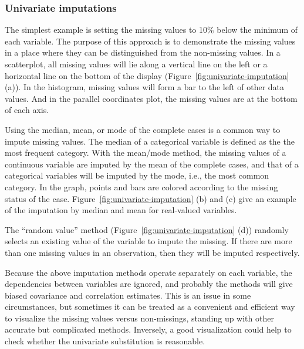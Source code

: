\documentclass[article]{jss}
\begin{document}
\subsubsection{Univariate imputations}

The simplest example is setting the missing values to 10\% below the minimum of each variable. The purpose of this approach is to demonstrate the missing values in a place where they can be distinguished from the non-missing values. In a scatterplot, all missing values will lie along a vertical line on the left or a horizontal line on the bottom of the display (Figure~\ref{fig:univariate-imputation} (a)). In the histogram, missing values will form a bar to the left of other data values. And in the parallel coordinates plot, the missing values are at the bottom of each axis.

Using the median, mean, or mode of the complete cases is a common way to impute missing values. The median of a categorical variable is defined as the the most frequent category. With the mean/mode method, the missing values of a continuous variable are imputed by the mean of the complete cases, and that of a categorical variables will be imputed by the mode, i.e., the most common category. In the graph, points and bars are colored according to the missing status of the case. Figure~\ref{fig:univariate-imputation} (b) and (c) give an example of the imputation by median and mean for real-valued variables.

The ``random value'' method (Figure~\ref{fig:univariate-imputation} (d)) randomly selects an existing value of the variable to impute the missing. If there are more than one missing values in an observation, then they will be imputed respectively.

Because the above imputation methods operate separately on each variable, the dependencies between variables are ignored, and probably the methods will give biased covariance and correlation estimates. This is an issue in some circumstances, but sometimes it can be treated as a convenient and efficient way to visualize the missing values versus non-missings, standing up with other accurate but complicated methods. Inversely, a good visualization could help to check whether the univariate substitution is reasonable.
\end{document}
